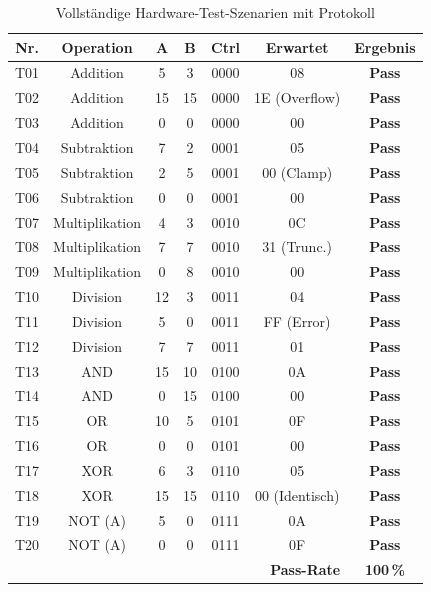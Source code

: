 ﻿\documentclass[12pt,a4paper]{report}
\begin{document}
\begin{table}[H]
\centering
\begin{tabular}{|c|c|c|c|c|c|c|}
\hline
\textbf{Nr.} & \textbf{Operation} & \textbf{A} & \textbf{B} & \textbf{Ctrl} & \textbf{Erwartet} & \textbf{Ergebnis} \\
\hline
T01 & Addition      &  5 &  3 & 0000 & 08            & \textbf{Pass} \\
T02 & Addition      & 15 & 15 & 0000 & 1E (Overflow) & \textbf{Pass} \\
T03 & Addition      &  0 &  0 & 0000 & 00            & \textbf{Pass} \\
T04 & Subtraktion   &  7 &  2 & 0001 & 05            & \textbf{Pass} \\
T05 & Subtraktion   &  2 &  5 & 0001 & 00 (Clamp)    & \textbf{Pass} \\
T06 & Subtraktion   &  0 &  0 & 0001 & 00            & \textbf{Pass} \\
T07 & Multiplikation&  4 &  3 & 0010 & 0C            & \textbf{Pass} \\
T08 & Multiplikation&  7 &  7 & 0010 & 31 (Trunc.)   & \textbf{Pass} \\
T09 & Multiplikation&  0 &  8 & 0010 & 00            & \textbf{Pass} \\
T10 & Division      & 12 &  3 & 0011 & 04            & \textbf{Pass} \\
T11 & Division      &  5 &  0 & 0011 & FF (Error)    & \textbf{Pass} \\
T12 & Division      &  7 &  7 & 0011 & 01            & \textbf{Pass} \\
T13 & AND           & 15 & 10 & 0100 & 0A            & \textbf{Pass} \\
T14 & AND           &  0 & 15 & 0100 & 00            & \textbf{Pass} \\
T15 & OR            & 10 &  5 & 0101 & 0F            & \textbf{Pass} \\
T16 & OR            &  0 &  0 & 0101 & 00            & \textbf{Pass} \\
T17 & XOR           &  6 &  3 & 0110 & 05            & \textbf{Pass} \\
T18 & XOR           & 15 & 15 & 0110 & 00 (Identisch)& \textbf{Pass} \\
T19 & NOT (A)       &  5 &  0 & 0111 & 0A            & \textbf{Pass} \\
T20 & NOT (A)       &  0 &  0 & 0111 & 0F            & \textbf{Pass} \\
\hline
\multicolumn{6}{|r|}{\textbf{Pass-Rate}} & \textbf{100\,\%} \\
\hline
\end{tabular}
\caption{Vollständige Hardware-Test-Szenarien mit Protokoll}
\label{tab:hardware_tests}
\end{table}
\end{document}
